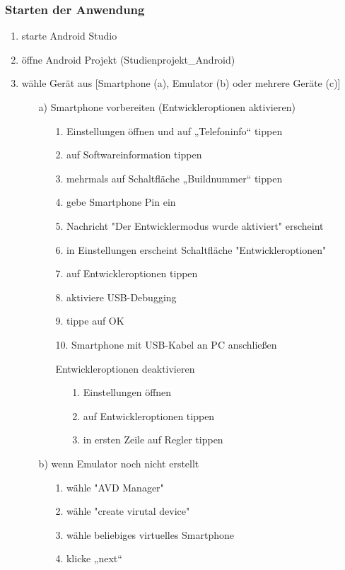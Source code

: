 \documentclass[12pt, onecolumn, notitlepage]{scrartcl}
\begin{document}
\subsubsection{Starten der Anwendung}
\begin{enumerate}
	\setlength\itemsep{0.07em}
	\item starte Android Studio
	\item öffne Android Projekt (Studienprojekt\_Android)
	\item wähle Gerät aus [Smartphone (a), Emulator (b) oder mehrere Geräte (c)]
	\begin{itemize}
		\item[a)] Smartphone vorbereiten (Entwickleroptionen aktivieren)
		\begin{enumerate}
			\item[1.] Einstellungen öffnen und auf „Telefoninfo“ tippen
			\item[2.] auf Softwareinformation tippen
			\item[3.] mehrmals auf Schaltfläche „Buildnummer“ tippen
			\item[4.] gebe Smartphone Pin ein
			\item[5.] Nachricht "Der Entwicklermodus wurde aktiviert" erscheint
			\item[6.] in Einstellungen erscheint Schaltfläche "Entwickleroptionen"
			\item[7.] auf Entwickleroptionen tippen
			\item[8.] aktiviere USB-Debugging
			\item[9.] tippe auf OK
			\item[10.] Smartphone mit USB-Kabel an PC anschließen
			\item[] Entwickleroptionen deaktivieren
			\begin{itemize}
				\item[1.] Einstellungen öffnen
				\item[2.] auf Entwickleroptionen tippen
				\item[3.] in ersten Zeile auf Regler tippen
			\end{itemize}
		\end{enumerate}
		\item[b)] wenn Emulator noch nicht erstellt
			\begin{itemize}
			\item[1.] wähle "AVD Manager"
			\item[2.] wähle "create virutal device"
			\item[3.] wähle beliebiges virtuelles Smartphone
			\item[4.] klicke „next“

\end{itemize}
\end{itemize}
\end{enumerate}
\end{document}
